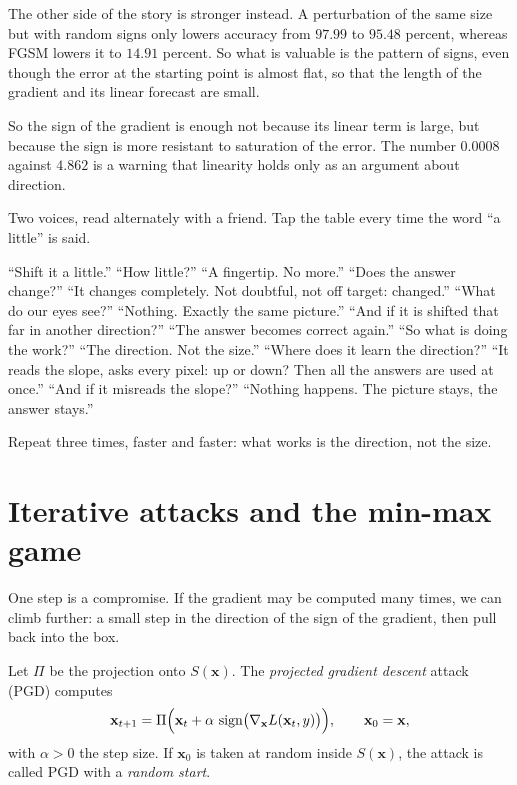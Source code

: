 The other side of the story is stronger instead. A perturbation of the same size but
with random signs only lowers accuracy from $97.99$ to $95.48$ percent, whereas FGSM
lowers it to $14.91$ percent. So what is valuable is the pattern of signs, even
though the error at the starting point is almost flat, so that the length of the
gradient and its linear forecast are small.

So the sign of the gradient is enough not because its linear term is large, but
because the sign is more resistant to saturation of the error. The number $0.0008$
against $4.862$ is a warning that linearity holds only as an argument about
direction.

\begin{bacakeras}
Two voices, read alternately with a friend. Tap the table every time the word ``a
little'' is said.

``Shift it a little.'' ``How little?'' ``A fingertip. No more.''
``Does the answer change?'' ``It changes completely. Not doubtful, not off target: changed.''
``What do our eyes see?'' ``Nothing. Exactly the same picture.''
``And if it is shifted that far in another direction?'' ``The answer becomes correct again.''
``So what is doing the work?'' ``The direction. Not the size.''
``Where does it learn the direction?'' ``It reads the slope, asks every pixel: up or
down? Then all the answers are used at once.''
``And if it misreads the slope?'' ``Nothing happens. The picture stays, the answer stays.''

Repeat three times, faster and faster: what works is the direction, not the size.
\end{bacakeras}

\section{Iterative attacks and the min-max game}

One step is a compromise. If the gradient may be computed many times, we can climb
further: a small step in the direction of the sign of the gradient, then pull back
into the box.

\begin{definisi}
Let $\Pi$ be the projection onto $S(\mathbf{x})$. The \emph{projected gradient
descent} attack (PGD) computes
\[
  \mathbf{x}_{t+1}=\Pi\Bigl(\mathbf{x}_t+\alpha\,
  \operatorname{sign}\bigl(\nabla_{\mathbf{x}}L(\mathbf{x}_t,y)\bigr)\Bigr),
  \qquad \mathbf{x}_0=\mathbf{x},
\]
with $\alpha>0$ the step size. If $\mathbf{x}_0$ is taken at random inside
$S(\mathbf{x})$, the attack is called PGD with a \emph{random start}.
\end{definisi}

